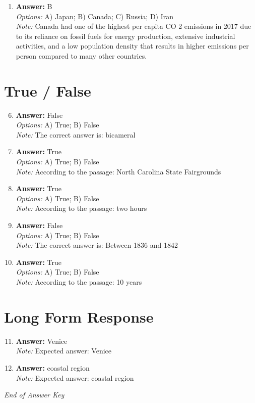 \documentclass[12pt]{article}
\begin{document}
\begin{enumerate}[label=\arabic*.]
\item \textbf{Answer:} B
\\ \textit{Options:} A) Japan; B) Canada; C) Russia; D) Iran
\\ \textit{Note:} Canada had one of the highest per capita CO 2 emissions in 2017 due to its reliance on fossil fuels for energy production, extensive industrial activities, and a low population density that results in higher emissions per person compared to many other countries.
\end{enumerate}

\section*{True / False}
\begin{enumerate}[label=\arabic*.]
\setcounter{enumi}{5}
\item \textbf{Answer:} False
\\ \textit{Options:} A) True; B) False
\\ \textit{Note:} The correct answer is: bicameral
\item \textbf{Answer:} True
\\ \textit{Options:} A) True; B) False
\\ \textit{Note:} According to the passage: North Carolina State Fairgrounds
\item \textbf{Answer:} True
\\ \textit{Options:} A) True; B) False
\\ \textit{Note:} According to the passage: two hours
\item \textbf{Answer:} False
\\ \textit{Options:} A) True; B) False
\\ \textit{Note:} The correct answer is: Between 1836 and 1842
\item \textbf{Answer:} True
\\ \textit{Options:} A) True; B) False
\\ \textit{Note:} According to the passage: 10 years
\end{enumerate}

\section*{Long Form Response}
\begin{enumerate}[label=\arabic*.]
\setcounter{enumi}{10}
\item \textbf{Answer:} Venice
\\ \textit{Note:} Expected answer: Venice
\item \textbf{Answer:} coastal region
\\ \textit{Note:} Expected answer: coastal region
\end{enumerate}

\vfill
\noindent\textit{End of Answer Key}
\end{document}

